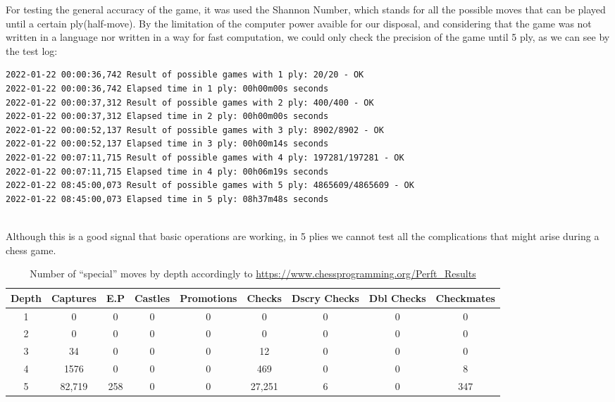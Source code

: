 \documentclass[10pt]{article}
\begin{document}
For testing the general accuracy of the game, it was used the Shannon Number,
which stands for all the possible moves that can be played until a certain
ply(half-move). By the limitation of the computer power avaible for our
disposal, and considering that the game was not written in a language nor
written in a way for fast computation, we could only check the precision of the
game until 5 ply, as we can see by the test log:
\begin{lstlisting}
2022-01-22 00:00:36,742 Result of possible games with 1 ply: 20/20 - OK
2022-01-22 00:00:36,742 Elapsed time in 1 ply: 00h00m00s seconds
2022-01-22 00:00:37,312 Result of possible games with 2 ply: 400/400 - OK
2022-01-22 00:00:37,312 Elapsed time in 2 ply: 00h00m00s seconds
2022-01-22 00:00:52,137 Result of possible games with 3 ply: 8902/8902 - OK
2022-01-22 00:00:52,137 Elapsed time in 3 ply: 00h00m14s seconds
2022-01-22 00:07:11,715 Result of possible games with 4 ply: 197281/197281 - OK
2022-01-22 00:07:11,715 Elapsed time in 4 ply: 00h06m19s seconds
2022-01-22 08:45:00,073 Result of possible games with 5 ply: 4865609/4865609 - OK
2022-01-22 08:45:00,073 Elapsed time in 5 ply: 08h37m48s seconds
    
\end{lstlisting}

Although this is a good signal that basic operations are working, in 5 plies we
cannot test all the complications that might arise during a chess game.

\begin{table}[h]
\center
\begin{tabular}{|c|c|c|c|c|c|c|c|c|}
\hline
\textbf{Depth}   & \textbf{Captures} & \textbf{E.P} &
\textbf{Castles} & \textbf{Promotions} & \textbf{Checks} & \textbf{Dscry
Checks} & \textbf{Dbl Checks} & \textbf{Checkmates} \\
\hline
   1  & 0 & 0 & 0 & 0 & 0 & 0 & 0 & 0 \\
\hline
   2  & 0 & 0 & 0 & 0 & 0 & 0 & 0 & 0 \\
\hline
   3  & 34 & 0 & 0 & 0 & 12 & 0 & 0 & 0 \\
\hline
   4  & 1576 & 0 & 0 & 0 & 469 & 0 & 0 & 8 \\
\hline
5  & 82,719 & 258 & 0 & 0 & 27,251 & 6 & 0 & 347 \\
\hline
\end{tabular}
\caption{Number of ``special'' moves by depth accordingly to
\url{https://www.chessprogramming.org/Perft_Results} }
\end{table}
\end{document}
